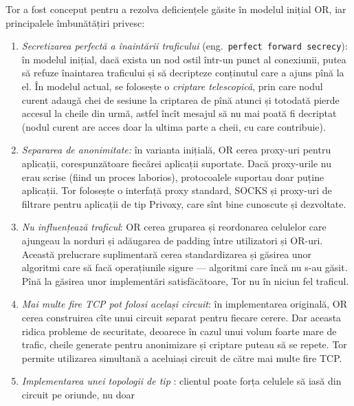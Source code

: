 Tor a fost conceput pentru a rezolva deficiențele găsite în modelul inițial OR,
iar principalele îmbunătățiri privesc:
\begin{enumerate}[(1)]
  \item \textit{Secretizarea perfectă a înaintării traficului} (eng.\ \texttt{perfect
    forward secrecy}): în modelul inițial, dacă exista un nod ostil într-un punct
    al conexiunii, putea să refuze înaintarea traficului și să decripteze
    conținutul care a ajuns pînă la el. În modelul actual, se folosește o
    \emph{criptare telescopică}, prin care nodul curent adaugă chei
    de sesiune la criptarea de pînă atunci și totodată pierde accesul la cheile din
    urmă, astfel încît mesajul să nu mai poată fi decriptat (nodul curent are
    acces doar la ultima parte a cheii, cu care contribuie).
  \item \textit{Separarea  de anonimitate:} în varianta
    inițială, OR cerea proxy-uri pentru aplicații, corespunzătoare fiecărei
    aplicații suportate. Dacă proxy-urile nu erau scrise (fiind un proces laborios),
    protocoalele suportau doar puține aplicații. Tor folosește o interfață
    proxy standard, SOCKS și proxy-uri de filtrare pentru aplicații de tip
    Privoxy, care sînt bine cunoscute și dezvoltate.
  \item \textit{Nu influențează traficul}: OR cerea gruparea și reordonarea
    celulelor care ajungeau la norduri și adăugarea de padding între utilizatori
    și OR-uri. 
    Această prelucrare suplimentară cerea standardizarea și găsirea unor algoritmi
    care să facă operațiunile sigure --- algoritmi care încă nu s-au găsit. Pînă
    la găsirea unor implementări satisfăcătoare, Tor nu  în niciun
    fel traficul.
  \item \textit{Mai multe fire TCP pot folosi același circuit}: în implementarea
    originală, OR cerea construirea cîte unui circuit separat pentru
    fiecare cerere. Dar aceasta ridica probleme de securitate, deoarece
    în cazul unui volum foarte mare de trafic, cheile generate pentru
    anonimizare și criptare puteau să se repete. Tor permite utilizarea
    simultană a aceluiași circuit de către mai multe fire TCP.
  \item \textit{Implementarea unei topologii de tip }:
    clientul poate forța celulele să iasă din circuit pe oriunde, nu doar

\end{enumerate}
